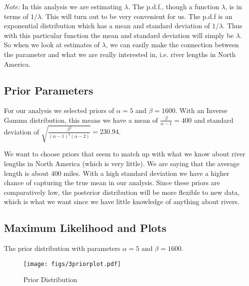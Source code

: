 \documentclass[12pt]{article}
\begin{document}
\begin{scriptsize}
\noindent \textit{Note:} In this analysis we are estimating $\lambda$.  The p.d.f., though a function $\lambda$, is in terms of $1/\lambda$.  This will turn out to be very convenient for us.  The p.d.f is an exponential distribution which has a mean and standard deviation of $1/\lambda$.  Thus with this particular function the mean and standard deviation will simply be $\lambda$.  So when we look at estimates of $\lambda$, we can easily make the connection between the parameter and what we are really interested in, i.e. river lengths in North America.
\end{scriptsize}

\subsection{Prior Parameters}

\noindent For our analysis we selected priors of $\alpha=5$ and $\beta=1600$.  With an Inverse Gamma distribution, this means we have a mean of $\frac{\beta}{\alpha-1}=400$ and standard deviation of $\sqrt{\frac{\beta^2}{(\alpha-1)^2(\alpha-2)}}=230.94$.
\bigskip

\noindent We want to choose priors that seem to match up with what we know about river lengths in North America (which is very little).  We are saying that the average length is about $400$ miles.  With a high standard deviation we have a higher chance of capturing the true mean in our analysis.  Since these priors are comparatively low, the posterior distribution will be more flexible to new data, which is what we want since we have little knowledge of anything about rivers.

\subsection{Maximum Likelihood and Plots}

The prior distribution with parameters $\alpha=5$ and $\beta=1600$. \\ [-.8cm]

\begin{figure}[H]
\begin{center}
\texttt{[image: figs/3priorplot.pdf]}
\caption{Prior Distribution}
\end{center}
\end{figure}

\ \\ [-1.55cm]
\end{document}
